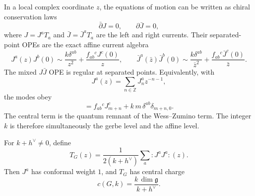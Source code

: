 In a local complex coordinate \(z\), the equations of motion can be written
as chiral conservation laws
\[
  \bar\partial J=0,
  \qquad
  \partial\bar J=0,
\]
where \(J=J^aT_a\) and \(\bar J=\bar J^aT_a\) are the left and right currents.
Their separated-point OPEs are the exact affine current algebra
\begin{equation}
  J^a(z)J^b(0)
  \sim
  \frac{k\delta^{ab}}{z^2}
  +
  \frac{f_{ab}{}^{c}J^c(0)}{z},
  \qquad
  \bar J^a(\bar z)\bar J^b(0)
  \sim
  \frac{k\delta^{ab}}{\bar z^2}
  +
  \frac{f_{ab}{}^{c}\bar J^c(0)}{\bar z}.
  \label{eq:wzw-current-ope}
\end{equation}
The mixed \(J\bar J\) OPE is regular at separated points.  Equivalently,
with
\[
  J^a(z)=\sum_{n\in\mathbb Z}J_n^a z^{-n-1},
\]
the modes obey
\begin{equation}
  [J_m^a,J_n^b]
  =
  f_{ab}{}^{c}J_{m+n}^c
  +
  k\,m\,\delta^{ab}\delta_{m+n,0}.
  \label{eq:affine-current-mode-algebra}
\end{equation}
The central term is the quantum remnant of the Wess--Zumino term.  The
integer \(k\) is therefore simultaneously the gerbe level and the affine
level.

\begin{proposition}
\label{prop:wzw-sugawara-stress-tensor}
For \(k+h^\vee\ne0\), define
\begin{equation}
  T_G(z)
  =
  \frac{1}{2(k+h^\vee)}
  \sum_a :J^aJ^a:(z).
  \label{eq:wzw-sugawara-stress-tensor}
\end{equation}
Then \(J^a\) has conformal weight \(1\), and \(T_G\) has central charge
\begin{equation}
  c(G,k)
  =
  \frac{k\,\dim\mathfrak g}{k+h^\vee}.
  \label{eq:wzw-central-charge}
\end{equation}
\end{proposition}

